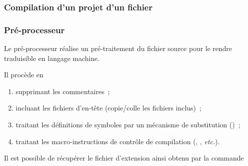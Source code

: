 \begin{frame}[fragile]
\frametitle{Compilation d'un projet d'un fichier}
\begin{center}
\end{center}
\end{frame}

\begin{frame}[fragile]
\frametitle{Pré-processeur}
Le \alert{pré-processeur} réalise un pré-traitement du fichier source
pour le rendre traduisible en langage machine.
\medskip

Il procède en
\begin{enumerate}
    \item supprimant les commentaires~;
    \smallskip

    \item incluant les fichiers d'en-tête
    (copie/colle les fichiers  inclus)~;
    \smallskip

    \item traitant les définitions de symboles par un
    mécanisme de substitution ()~;
    \smallskip

    \item traitant les macro-instructions de contrôle de compilation
    (, , {\em etc.}).
\end{enumerate}
\medskip

Il est possible de récupérer le fichier d'extension  ainsi
obtenu par la commande
\begin{center}  \end{center}
\end{frame}

